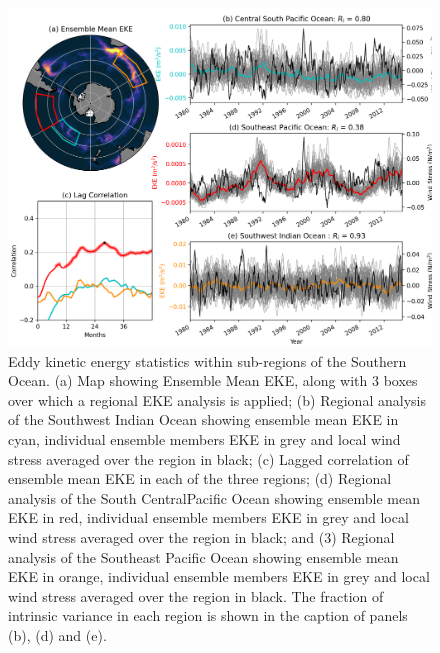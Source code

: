 \documentclass{agujournal2019}
\begin{document}
\begin{figure}[t]
\begin{center}
\includegraphics[width=\hsize]{Figure4}
\caption{Eddy kinetic energy statistics within sub-regions of the Southern Ocean. (a) Map showing Ensemble Mean EKE, along with 3 boxes over which a regional EKE analysis is applied; (b) Regional analysis of the Southwest Indian Ocean showing ensemble mean EKE in cyan, individual ensemble members EKE in grey and local wind stress averaged over the region in black; (c) Lagged correlation of ensemble mean EKE in each of the three regions; (d) Regional analysis of the South CentralPacific Ocean showing ensemble mean EKE in red, individual ensemble members EKE in grey and local wind stress averaged over the region in black; and (3) Regional analysis of the Southeast Pacific Ocean showing ensemble mean EKE in orange, individual ensemble members EKE in grey and local wind stress averaged over the region in black. The fraction of intrinsic variance in each region is shown in the caption of panels (b), (d) and (e).}
\label{Fig:4}
\end{center}
\end{figure}
\end{document}
